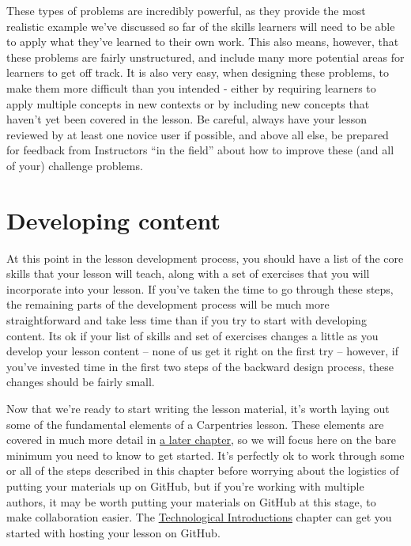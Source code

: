 \documentclass[]{book}
\begin{document}
These types of problems are incredibly powerful, as
they provide the most realistic example we've discussed so far of the skills learners will
need to be able to apply what they've learned to their own work. This also means, however,
that these problems are fairly unstructured, and include many more potential areas for learners
to get off track. It is also very easy, when designing these problems, to make them more
difficult than you intended - either by requiring learners to apply multiple concepts in new
contexts or by including new concepts that haven't yet been covered in the lesson. Be careful,
always have your lesson reviewed by at least one novice user if possible, and above all else,
be prepared for feedback from Instructors ``in the field'' about how to improve these (and all of your) challenge problems.

\hypertarget{developing-content}{%
\chapter{Developing content}\label{developing-content}}

At this point in the lesson development process, you should have a list of the core skills that your lesson
will teach, along with a set of exercises that you will incorporate into your lesson. If you've taken the time
to go through these steps, the remaining parts of the development process will be much more straightforward
and take less time than if you try to start with developing content. Its ok if your list of skills and set
of exercises changes a little as you develop your lesson content -- none of us get it right on the first try --
however, if you've invested time in the first two steps of the backward design process,
these changes should be fairly small.

Now that we're ready to start writing the lesson material, it's worth laying out some of the fundamental
elements of a Carpentries lesson. These elements are covered in much more detail in \href{https://carpentries.github.io/curriculum-development/technological-introductions.html}{a later chapter}, so we will focus
here on the bare minimum you need to know to get started. It's perfectly ok to work through some or all of the
steps described in this chapter before worrying about the logistics of putting your materials up on GitHub,
but if you're working with multiple authors, it may be worth putting your materials on GitHub at this stage,
to make collaboration easier. The \href{https://carpentries.github.io/curriculum-development/technological-introductions.html}{Technological Introductions} chapter
can get you started with hosting your lesson on GitHub.
\end{document}
